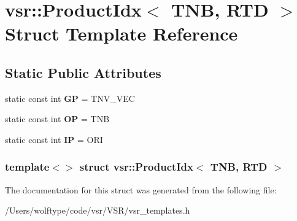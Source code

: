 \hypertarget{structvsr_1_1_product_idx_3_01_t_n_b_00_01_r_t_d_01_4}{\section{vsr\-:\-:Product\-Idx$<$ T\-N\-B, R\-T\-D $>$ Struct Template Reference}
\label{structvsr_1_1_product_idx_3_01_t_n_b_00_01_r_t_d_01_4}
}
\subsection*{Static Public Attributes}
\begin{DoxyCompactItemize}
\item 
\hypertarget{structvsr_1_1_product_idx_3_01_t_n_b_00_01_r_t_d_01_4_addd83e696fe5e5af933f2f01644c2baf}{static const int {\bfseries G\-P} = T\-N\-V\-\_\-\-V\-E\-C}\label{structvsr_1_1_product_idx_3_01_t_n_b_00_01_r_t_d_01_4_addd83e696fe5e5af933f2f01644c2baf}

\item 
\hypertarget{structvsr_1_1_product_idx_3_01_t_n_b_00_01_r_t_d_01_4_a983c1aef69fe11210d42841acbfa1311}{static const int {\bfseries O\-P} = T\-N\-B}\label{structvsr_1_1_product_idx_3_01_t_n_b_00_01_r_t_d_01_4_a983c1aef69fe11210d42841acbfa1311}

\item 
\hypertarget{structvsr_1_1_product_idx_3_01_t_n_b_00_01_r_t_d_01_4_ae05031b5e31d7c3c60d8dfbcf84177ae}{static const int {\bfseries I\-P} = O\-R\-I}\label{structvsr_1_1_product_idx_3_01_t_n_b_00_01_r_t_d_01_4_ae05031b5e31d7c3c60d8dfbcf84177ae}

\end{DoxyCompactItemize}
\subsubsection*{template$<$$>$ struct vsr\-::\-Product\-Idx$<$ T\-N\-B, R\-T\-D $>$}



The documentation for this struct was generated from the following file\-:\begin{DoxyCompactItemize}
\item 
/\-Users/wolftype/code/vsr/\-V\-S\-R/vsr\-\_\-templates.\-h\end{DoxyCompactItemize}
